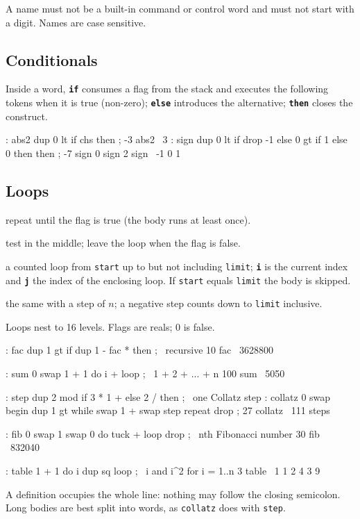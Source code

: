 \documentclass[11pt,letterpaper]{article}
\newcommand{\code}[1]{\texttt{#1}}
\newcommand{\cmd}[1]{\texttt{\textbf{#1}}}
\begin{document}
A name must not be a built-in command or control word and must not start with a digit. Names are case sensitive.

\subsection{Conditionals}

Inside a word, \cmd{if} consumes a flag from the stack and executes the following tokens when it is true (non-zero); \cmd{else} introduces the alternative; \cmd{then} closes the construct.
\begin{rpn}
: abs2 dup 0 lt if chs then ;
-3 abs2              \ 3
: sign dup 0 lt if drop -1 else 0 gt if 1 else 0 then then ;
-7 sign 0 sign 2 sign     \ -1 0 1
\end{rpn}

\subsection{Loops}

\begin{description}[style=nextline,leftmargin=1.5em]
  \item[\code{begin ... flag until}] repeat until the flag is true (the body runs at least once).
  \item[\code{begin ... flag while ... repeat}] test in the middle; leave the loop when the flag is false.
  \item[\code{limit start do ... loop}] a counted loop from \code{start} up to but not including \code{limit}; \cmd{i} is the current index and \cmd{j} the index of the enclosing loop. If \code{start} equals \code{limit} the body is skipped.
  \item[\code{limit start do ... n +loop}] the same with a step of $n$; a negative step counts down to \code{limit} inclusive.
\end{description}
Loops nest to 16 levels. Flags are reals; 0 is false.
\begin{rpn}
: fac dup 1 gt if dup 1 - fac * then ;         \ recursive
10 fac                                       \ 3628800

: sum 0 swap 1 + 1 do i + loop ;             \ 1 + 2 + ... + n
100 sum                                      \ 5050

: step dup 2 mod if 3 * 1 + else 2 / then ;   \ one Collatz step
: collatz 0 swap begin dup 1 gt while swap 1 + swap step repeat drop ;
27 collatz                                   \ 111 steps

: fib 0 swap 1 swap 0 do tuck + loop drop ;  \ nth Fibonacci number
30 fib                                       \ 832040

: table 1 + 1 do i dup sq loop ;             \ i and i^2 for i = 1..n
3 table                                      \ 1 1 2 4 3 9
\end{rpn}
A definition occupies the whole line: nothing may follow the closing semicolon. Long bodies are best split into words, as \code{collatz} does with \code{step}.
\end{document}
